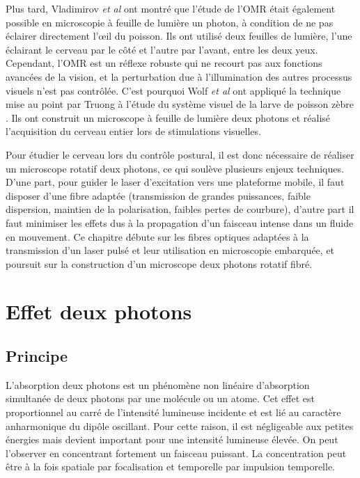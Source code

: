 Plus tard, Vladimirov \emph{et al} \cite{vladimirov_light-sheet_2014} ont montré que l'étude de l'OMR était également possible en microscopie à feuille de lumière un photon, à condition de ne pas éclairer directement l'œil du poisson. Ils ont utilisé deux feuilles de lumière, l'une éclairant le cerveau par le côté et l'autre par l'avant, entre les deux yeux. Cependant, l'OMR est un réflexe robuste qui ne recourt pas aux fonctions avancées de la vision, et la perturbation due à l'illumination des autres processus visuels n'est pas contrôlée. C'est pourquoi Wolf \emph{et al} ont appliqué la technique mise au point par Truong à l'étude du système visuel de la larve de poisson zèbre \cite{wolf_whole-brain_2015}. Ils ont construit un microscope à feuille de lumière deux photons et réalisé l'acquisition du cerveau entier lors de stimulations visuelles.


Pour étudier le cerveau lors du contrôle postural, il est donc nécessaire de réaliser un microscope rotatif deux photons, ce qui soulève plusieurs enjeux techniques. D'une part, pour guider le laser d'excitation vers une plateforme mobile, il faut disposer d'une fibre adaptée (transmission de grandes puissances, faible dispersion, maintien de la polarisation, faibles pertes de courbure), d'autre part il faut minimiser les effets dus à la propagation d'un faisceau intense dans un fluide en mouvement. Ce chapitre débute sur les fibres optiques adaptées à la transmission d'un laser pulsé et leur utilisation en microscopie embarquée, et poursuit sur la construction d'un microscope deux photons rotatif fibré.



\section{Effet deux photons}

\subsection{Principe}

L'absorption deux photons est un phénomène non linéaire d'absorption simultanée de deux photons par une molécule ou un atome. Cet effet est proportionnel au carré de l'intensité lumineuse incidente et est lié au caractère anharmonique du dipôle oscillant. Pour cette raison, il est négligeable aux petites énergies mais devient important pour une intensité lumineuse élevée. On peut l'observer en concentrant fortement un faisceau puissant. La concentration peut être à la fois spatiale par focalisation et temporelle par impulsion temporelle.

